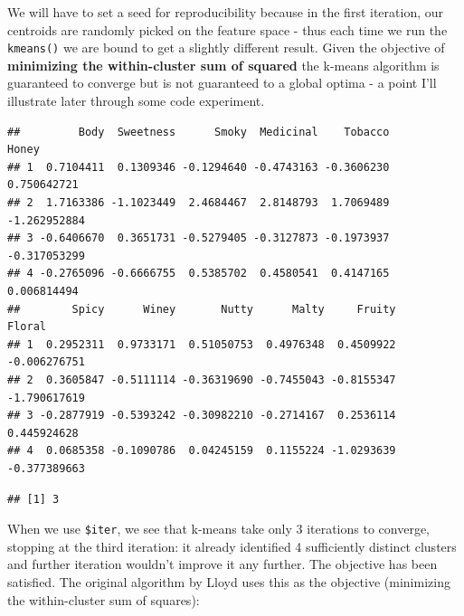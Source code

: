 \documentclass[]{article}
\newenvironment{Shaded}{\begin{snugshade}}{\end{snugshade}}
\newcommand{\CommentTok}[1]{\textcolor[rgb]{0.56,0.35,0.01}{\textit{#1}}}
\newcommand{\DecValTok}[1]{\textcolor[rgb]{0.00,0.00,0.81}{#1}}
\newcommand{\KeywordTok}[1]{\textcolor[rgb]{0.13,0.29,0.53}{\textbf{#1}}}
\newcommand{\NormalTok}[1]{#1}
\newcommand{\OperatorTok}[1]{\textcolor[rgb]{0.81,0.36,0.00}{\textbf{#1}}}
\newcommand{\StringTok}[1]{\textcolor[rgb]{0.31,0.60,0.02}{#1}}
\begin{document}
We will have to set a seed for reproducibility because in the first
iteration, our centroids are randomly picked on the feature space - thus
each time we run the \texttt{kmeans()} we are bound to get a slightly
different result. Given the objective of \textbf{minimizing the
within-cluster sum of squared} the k-means algorithm is guaranteed to
converge but is not guaranteed to a global optima - a point I'll
illustrate later through some code experiment.

\begin{Shaded}
\end{Shaded}

\begin{verbatim}
##         Body  Sweetness      Smoky  Medicinal    Tobacco        Honey
## 1  0.7104411  0.1309346 -0.1294640 -0.4743163 -0.3606230  0.750642721
## 2  1.7163386 -1.1023449  2.4684467  2.8148793  1.7069489 -1.262952884
## 3 -0.6406670  0.3651731 -0.5279405 -0.3127873 -0.1973937 -0.317053299
## 4 -0.2765096 -0.6666755  0.5385702  0.4580541  0.4147165  0.006814494
##        Spicy      Winey       Nutty      Malty     Fruity       Floral
## 1  0.2952311  0.9733171  0.51050753  0.4976348  0.4509922 -0.006276751
## 2  0.3605847 -0.5111114 -0.36319690 -0.7455043 -0.8155347 -1.790617619
## 3 -0.2877919 -0.5393242 -0.30982210 -0.2714167  0.2536114  0.445924628
## 4  0.0685358 -0.1090786  0.04245159  0.1155224 -1.0293639 -0.377389663
\end{verbatim}

\begin{Shaded}
\end{Shaded}

\begin{verbatim}
## [1] 3
\end{verbatim}

When we use \texttt{\$iter}, we see that k-means take only 3 iterations
to converge, stopping at the third iteration: it already identified 4
sufficiently distinct clusters and further iteration wouldn't improve it
any further. The objective has been satisfied. The original algorithm by
Lloyd uses this as the objective (minimizing the within-cluster sum of
squares):
\end{document}
